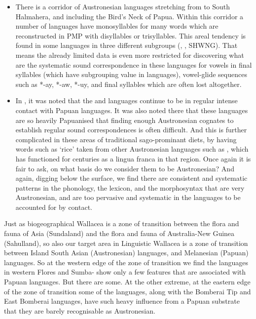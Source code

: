 \begin{itemize}
			Or maybe Austronesian languages in Papuan disguise?”\footnote{
					Questions
					posed by Mark Donohue in 2011,
					and reiterated in \citet{DonohueDenham2020}.}
			On what basis
			do we consider them to be Austronesian? Digging below the surface,
			we find there are consistent
			and systematic patterns in the phonology,
			the lexicon, and the morphosyntax that are very Austronesian,
			and are too pervasive,
			systematic and deep-seated to be accounted for by contact.
			Hence we say they are Austronesian languages.
			But they are also not “Austronesian” in the same way as languages
			in western Indonesia or the Philippines.
\item	There is a corridor of Austronesian languages stretching from
			 to South Halmahera,
			and including the Bird’s Neck of Papua.
			Within this corridor a number of languages have monosyllables
			for many words which are reconstructed in PMP with disyllables or trisyllables.
			This areal tendency is found in some languages in three different
			subgroups (, , SHWNG).
			That means the already limited data is even more restricted for
			discovering what are the systematic sound correspondence in these
			languages for vowels in final syllables (which have subgrouping
			value in  languages),
			vowel-glide sequences such as *-ay,
			*-aw, *-uy, and final syllables which are often lost altogether.
\item	In ,
			it was noted that the 
			and  languages continue to be in regular intense
			contact with Papuan languages.
			It was also noted there that these languages are so heavily Papuanised
			that finding enough Austronesian cognates to establish regular
			sound correspondences is often difficult.
			And this is further complicated in these areas of traditional
			sago-prominant diets, by having words such as ‘rice’ taken from other Austronesian
			languages such as ,
			which has functioned for centuries as a lingua franca in that region.
			Once again it is fair to ask,
			on what basis do we consider them to be Austronesian?
			And again, digging below the surface,
			we find there are consistent
			and systematic patterns in the phonology,
			the lexicon, and the morphosyntax that are very Austronesian,
			and are too pervasive
			and systematic in the languages to be accounted for by contact.	
\end{itemize}

Just as biogeographical Wallacea is a zone of transition between
the flora and fauna of Asia (Sundaland)
and the flora and fauna of Australia-New Guinea (Sahulland),
so also our target area in Linguistic Wallacea is a zone of transition
between Island South Asian (Austronesian) languages,
and Melanesian (Papuan) languages.
So at the western edge of the zone of transition we find the
languages in western Flores
and Sumba- show only a few features that are associated with Papuan languages.
But there are some.
At the other extreme,
at the eastern edge of the zone of transition some of the 
languages, along with the Bomberai Tip
and East Bomberai languages,
have such heavy influence from a Papuan substrate that they are
barely recognisable as Austronesian.
